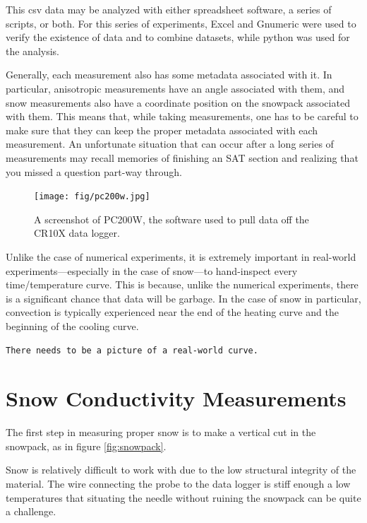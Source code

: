 This csv data may be analyzed with either spreadsheet software, a series of
scripts, or both. For this series of experiments, Excel and Gnumeric were used
to verify the existence of data and to combine datasets, while python was used
for the analysis.

Generally, each measurement also has some metadata associated with it. In
particular, anisotropic measurements have an angle associated with them, and
snow measurements also have a coordinate position on the snowpack associated
with them. This means that, while taking measurements, one has to be careful to
make sure that they can keep the proper metadata associated with each
measurement. An unfortunate situation that can occur after a long series of
measurements may recall memories of finishing an SAT section and realizing that
you missed a question part-way through. 

\begin{figure}[h]
\centering
\texttt{[image: fig/pc200w.jpg]}
\label{fig:pc200w}
\caption{A screenshot of PC200W, the software used to pull data off the CR10X data logger.}
\end{figure}

Unlike the case of numerical experiments, it is extremely important in
real-world experiments---especially in the case of snow---to hand-inspect every
time/temperature curve. This is because, unlike the numerical experiments, there
is a significant chance that data will be garbage. In the case of snow in
particular, convection is typically experienced near the end of the heating
curve and the beginning of the cooling curve.

\begin{verbatim}
There needs to be a picture of a real-world curve.
\end{verbatim}

\section{Snow Conductivity Measurements}

The first step in measuring proper snow is to make a vertical cut in the
snowpack, as in figure \ref{fig:snowpack}.

Snow is relatively difficult to work with due to the low structural integrity
of the material.  The wire connecting the probe to the data logger is stiff
enough a low temperatures that situating the needle without ruining the snowpack
can be quite a challenge.

